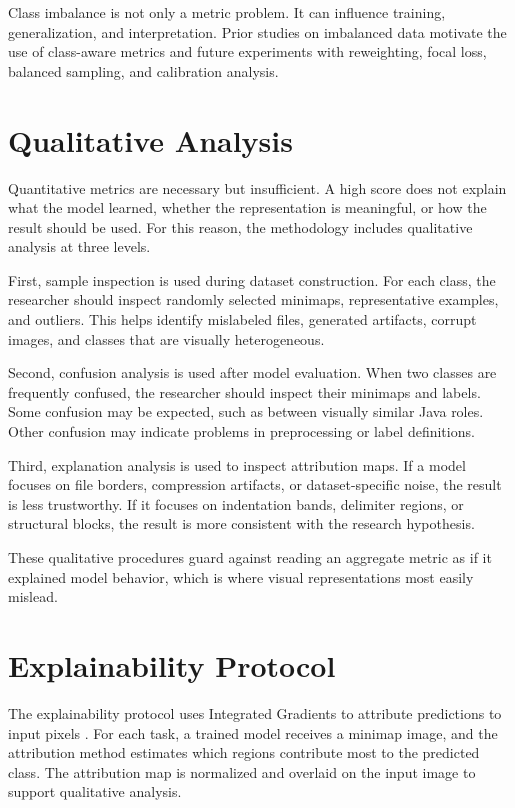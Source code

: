 Class imbalance is not only a metric problem. It can influence training,
generalization, and interpretation. Prior studies on imbalanced data
\cite{he2009imbalance,japkowicz2002,ortigosa2017} motivate the use of
class-aware metrics and future experiments with reweighting, focal loss,
balanced sampling, and calibration analysis.

\section{Qualitative Analysis}

Quantitative metrics are necessary but insufficient. A high score does not
explain what the model learned, whether the representation is meaningful, or how
the result should be used. For this reason, the methodology includes qualitative
analysis at three levels.

First, sample inspection is used during dataset construction. For each class,
the researcher should inspect randomly selected minimaps, representative
examples, and outliers. This helps identify mislabeled files, generated
artifacts, corrupt images, and classes that are visually heterogeneous.

Second, confusion analysis is used after model evaluation. When two classes are
frequently confused, the researcher should inspect their minimaps and labels.
Some confusion may be expected, such as between visually similar Java roles.
Other confusion may indicate problems in preprocessing or label definitions.

Third, explanation analysis is used to inspect attribution maps. If a model
focuses on file borders, compression artifacts, or dataset-specific noise, the
result is less trustworthy. If it focuses on indentation bands, delimiter
regions, or structural blocks, the result is more consistent with the research
hypothesis.

These qualitative procedures guard against reading an aggregate metric as if it
explained model behavior, which is where visual representations most easily
mislead.

\section{Explainability Protocol}

The explainability protocol uses Integrated Gradients to attribute predictions
to input pixels \cite{integratedgradients2017}. For each task, a trained model
receives a minimap image, and the attribution method estimates which regions
contribute most to the predicted class. The attribution map is normalized and
overlaid on the input image to support qualitative analysis.

